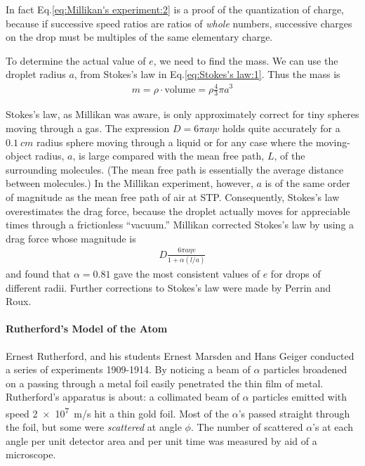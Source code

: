         \starpar In fact Eq.\eqref{eq:Millikan's experiment:2} is a proof of the quantization of charge, because if successive speed ratios 
        are ratios of \emph{whole} numbers, successive charges on the drop must be multiples of the same elementary charge.

        \bulletpar  To determine the actual value of $e$, we need to find the mass. We can use the droplet radius $a$, from Stokes’s law in
        Eq.\eqref{eq:Stokes's law:1}. Thus the mass is 
        \begin{align*}
            m = \rho \cdot \text{volume} = \rho \frac{4}{3} \pi a^3
        \end{align*}

        \bulletpar Stokes’s law, as Millikan was aware, is only approximately correct for tiny spheres moving through a gas. 
        The expression $D=6 \pi a \eta v$ holds quite accurately for a $\SI{0.1}{cm}$ radius sphere moving through a liquid or for any 
        case where the moving-object radius, $a$, is large compared with the mean free path, $L$, of the surrounding molecules. 
        (The mean free path is essentially the average distance between molecules.) In the Millikan experiment, however, $a$ is of the 
        same order of magnitude as the mean free path of air at STP. Consequently, Stokes’s law overestimates the drag force, because the 
        droplet actually moves for appreciable times through a frictionless “vacuum.” Millikan corrected Stokes’s law by using a drag force 
        whose magnitude is
        \begin{align}
            \label{eq:Corrected Stokes's law}
            D \frac{6 \pi a \eta v}{1 + \alpha (l/a)}
        \end{align}
        and found that $\alpha=\num{0.81}$ gave the most consistent values of $e$ for drops of different radii. Further corrections to Stokes’s 
        law were made by Perrin and Roux.

        \paragraph{Rutherford's Model of the Atom} %
        \label{par:Rutherford's Model of the Atom}
        Ernest Rutherford, and his students Ernest Marsden and Hans Geiger conducted a series of experiments 1909-1914. By noticing a beam of $\alpha$ particles broadened
        on a passing through a metal foil easily penetrated the thin film of metal. Rutherford's apparatus is about: a collimated beam of $\alpha$ particles emitted with 
        speed \SI{2e7}{m/s} hit a thin gold foil. Most of the $\alpha$'s passed straight through the foil, but some were \textit{scattered} at angle $\phi$. The number of 
        scattered $\alpha$'s at each angle per unit detector area and per unit time was measured by aid of a microscope.

